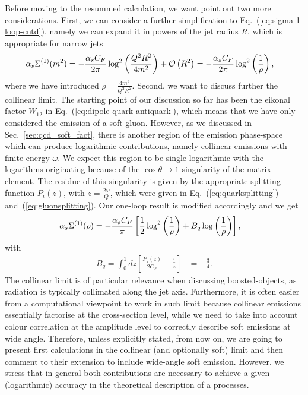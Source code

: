 Before moving to the resummed calculation, we want point out two more considerations. 
%
First,  we can consider a further simplification to Eq.~(\ref{eq:sigma-1-loop-cntd}), namely we can expand it in powers of the jet radius $R$, which is appropriate for narrow jets
\begin{align}\label{eq:sigma-1-loop-smallR}
\alpha_s \Sigma^{(1)}(m^2)&=- \frac{\alpha_s C_F}{2 \pi}  \log^2 \left( \frac{Q^2R^2}{4 m^2}  \right) +\mathcal{O} \left( R^2\right)
=- \frac{\alpha_s C_F}{2 \pi}  \log^2 \left( \frac{1}{\rho}  \right),
\end{align}
where we have introduced $\rho=\frac{4 m^2}{Q^2R^2}$.
%
Second, we want to discuss further the collinear limit. 
%
The starting point of our discussion so far has been the eikonal factor
$W_{12}$ in Eq.~(\ref{eq:dipole-quark-antiquark}), which means that we
have only considered the emission of a soft gluon. However, as we
discussed in Sec.~\ref{sec:qcd_soft_fact}, there is another region
of the emission phase-space which can produce logarithmic
contributions, namely collinear emissions with finite energy
$\omega$. We expect this region to be single-logarithmic with the
logarithms originating because of the $\cos \theta \to 1$ singularity
of the matrix element. The residue of this singularity is given by the
appropriate splitting function $P_i(z)$, with $z= \frac{2 \omega}{Q}$,
which were given in Eq.~(\ref{eq:quarksplitting})
and~(\ref{eq:gluonsplitting}). Our one-loop result is modified
accordingly and we get
\begin{align}\label{eq:sigma-1-loop-smallR-coll}
\alpha_s \Sigma^{(1)}(\rho)&
=- \frac{\alpha_s C_F}{ \pi}  \left [\frac{1}{2} \log^2\left(\frac{1}{\rho}\right)  +B_q \log \left(\frac{1}{\rho}\right) \right],
\end{align}
with 
\begin{align}\label{eq:B1}
B_q=\int_0^1 d z \left[ \frac{P_{q}(z)}{2C_F}-\frac{1}{z}  \right]&= -\frac{3}{4}.
\end{align}
The collinear limit is of particular relevance when discussing
boosted-objects, as radiation is typically collimated along the jet
axis.  Furthermore, it is often easier from a computational viewpoint
to work in such limit because collinear emissions essentially
factorise at the cross-section level, while we need to take into
account colour correlation at the amplitude level to correctly
describe soft emissions at wide angle. Therefore, unless explicitly
stated, from now on, we are going to present first calculations in the
collinear (and optionally soft) limit and then comment to their
extension to include wide-angle soft emission. However, we stress that
in general both contributions are necessary to achieve a given
(logarithmic) accuracy in the theoretical description of a processes.


